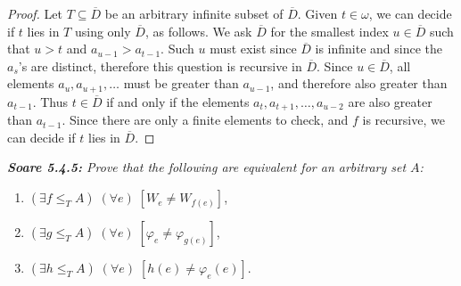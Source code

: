 \documentclass{article}
\begin{document}
  \begin{proof}
    Let $T\subseteq\overline{D}$ be an arbitrary infinite subset of
    $\overline{D}$. Given $t\in\omega$, we can decide if $t$ lies in $T$
    using only $\overline{D}$, as follows. We ask $\overline{D}$ for the
    smallest index $u\in\overline{D}$ such that $u>t$ and
    $a_{u-1}>a_{t-1}$. Such $u$ must exist since $\overline{D}$ is infinite
    and since the $a_s$'s are distinct, therefore this question is
    recursive in $\overline{D}$.  Since $u\in\overline{D}$, all elements
    $a_u,a_{u+1},\ldots$ must be greater than $a_{u-1}$, and therefore also
    greater than $a_{t-1}$. Thus $t\in\overline{D}$ if and only if the
    elements $a_t,a_{t+1},\ldots,a_{u-2}$ are also greater than $a_{t-1}$.
    Since there are only a finite elements to check, and $f$ is recursive,
    we can decide if $t$ lies in $\overline{D}$.
  \end{proof}

\it \textbf{Soare 5.4.5:} Prove that the following are equivalent for an
  arbitrary set $A$:

  \begin{enumerate}[label={(\roman*)}]
    \item $(\exists f\leq_T A)\; (\forall e)\; [W_e\neq W_{f(e)}]$,
    \item $(\exists g\leq_T A)\; (\forall e)\; [\varphi_e\neq
      \varphi_{g(e)}]$,
    \item $(\exists h\leq_T A)\; (\forall e)\; [h(e)\neq \varphi_e(e)]$.
  \end{enumerate}
\end{document}
